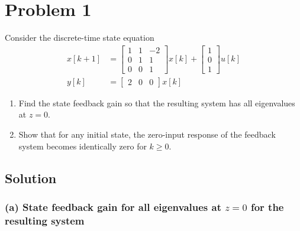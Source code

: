 \section*{Problem 1}

Consider the discrete-time state equation
\begin{align*}
    x[k+1]
     & =
    \begin{bmatrix}
        1 & 1 & -2 \\
        0 & 1 & 1  \\
        0 & 0 & 1
    \end{bmatrix}
    x[k] +
    \begin{bmatrix}
        1 \\
        0 \\
        1
    \end{bmatrix}
    u[k]
    \\
    y[k]
     & =
    \begin{bmatrix}
        2 & 0 & 0
    \end{bmatrix}
    x[k]
\end{align*}
\begin{enumerate}[label= (\alph*)]
    \item Find the state feedback gain so that the resulting system has all eigenvalues at \( z=0 \).
    \item Show that for any initial state, the zero-input response of the feedback system becomes identically zero for \( k \geq 0 \).
\end{enumerate}

\subsection*{Solution}

\subsubsection*{(a) State feedback gain for all eigenvalues at \( z = 0 \) for the resulting system}

